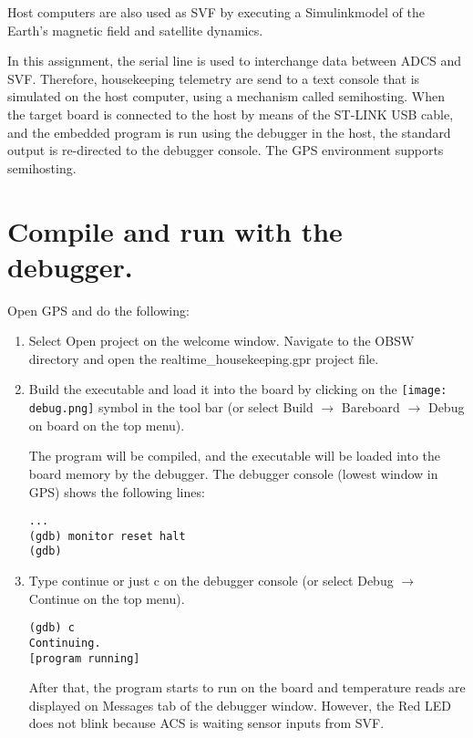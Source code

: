 Host computers are also used as SVF by executing a Simulink\texttrademark model of the Earth's magnetic field and satellite dynamics.

In this assignment, the serial line is used to interchange data between ADCS and SVF. Therefore, housekeeping telemetry are send to a text console that is simulated on the host computer, using a mechanism called semihosting. When the target board is connected to the host by means of the ST-LINK USB cable, and the embedded program is run using the debugger in the host, the standard output is re-directed to the debugger console. The GPS environment supports semihosting.

\section{Compile and run with the debugger.}

Open GPS and do the following:
\begin{enumerate}
\item Select Open project on the welcome window. Navigate to the OBSW directory and open the realtime\_housekeeping.gpr project file.
\item Build the executable and load it into the board by clicking on the \hbox{\texttt{[image: debug.png]}} symbol in the tool bar (or select Build $\rightarrow$ Bareboard $\rightarrow$ Debug on board on the top menu).

The program will be compiled, and the executable will be loaded into the board memory by the debugger. The debugger console (lowest window in GPS) shows the following lines:
\begin{verbatim}
...
(gdb) monitor reset halt
(gdb)
\end{verbatim}

\item Type continue or just c on the debugger console (or select Debug $\rightarrow$ Continue on the top menu).
\begin{verbatim}
(gdb) c
Continuing.
[program running]
\end{verbatim}

After that, the program starts to run on the board and temperature reads are displayed on Messages tab of the debugger window. However, the Red LED does not blink because ACS is waiting sensor inputs from SVF.
\end{enumerate}


